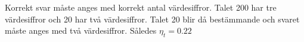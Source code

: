 \documentclass[./exercises.tex]{subfiles}
\begin{document}
Korrekt svar måste anges med korrekt antal värdesiffror. Talet 200 har tre värdesiffror
och 20 har två värdesiffror. Talet 20 blir då bestämmande och svaret måste anges med
två värdesiffror. Således $\eta_t = 0.22$
\end{document}

